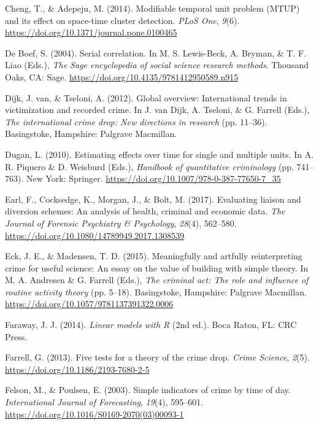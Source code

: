 \documentclass[
  english,
  man,a4paper,mask,floatsintext]{apa6}
\begin{document}
\leavevmode\hypertarget{ref-Cheng:2014aa}{}%
Cheng, T., \& Adepeju, M. (2014). Modifiable temporal unit problem (MTUP) and its effect on space-time cluster detection. \emph{PLoS One}, \emph{9}(6). \url{https://doi.org/10.1371/journal.pone.0100465}

\leavevmode\hypertarget{ref-De-Boef:2004aa}{}%
De Boef, S. (2004). Serial correlation. In M. S. Lewis-Beck, A. Bryman, \& T. F. Liao (Eds.), \emph{The Sage encyclopedia of social science research methods}. Thousand Oaks, CA: Sage. \url{https://doi.org/10.4135/9781412950589.n915}

\leavevmode\hypertarget{ref-Dijk:2012aa}{}%
Dijk, J. van, \& Tseloni, A. (2012). Global overview: International trends in victimization and recorded crime. In J. van Dijk, A. Tseloni, \& G. Farrell (Eds.), \emph{The international crime drop: New directions in research} (pp. 11--36). Basingstoke, Hampshire: Palgrave Macmillan.

\leavevmode\hypertarget{ref-Dugan:2010aa}{}%
Dugan, L. (2010). Estimating effects over time for single and multiple units. In A. R. Piquero \& D. Weisburd (Eds.), \emph{Handbook of quantitative criminology} (pp. 741--763). New York: Springer. \url{https://doi.org/10.1007/978-0-387-77650-7_35}

\leavevmode\hypertarget{ref-Earl:2017aa}{}%
Earl, F., Cocksedge, K., Morgan, J., \& Bolt, M. (2017). Evaluating liaison and diversion schemes: An analysis of health, criminal and economic data. \emph{The Journal of Forensic Psychiatry \& Psychology}, \emph{28}(4), 562--580. \url{https://doi.org/10.1080/14789949.2017.1308539}

\leavevmode\hypertarget{ref-Eck:2015aa}{}%
Eck, J. E., \& Madensen, T. D. (2015). Meaningfully and artfully reinterpreting crime for useful science: An essay on the value of building with simple theory. In M. A. Andresen \& G. Farrell (Eds.), \emph{The criminal act: The role and influence of routine activity theory} (pp. 5--18). Basingstoke, Hampshire: Palgrave Macmillan. \url{https://doi.org/10.1057/9781137391322.0006}

\leavevmode\hypertarget{ref-Faraway:2014aa}{}%
Faraway, J. J. (2014). \emph{Linear models with R} (2nd ed.). Boca Raton, FL: CRC Press.

\leavevmode\hypertarget{ref-Farrell:2013aa}{}%
Farrell, G. (2013). Five tests for a theory of the crime drop. \emph{Crime Science}, \emph{2}(5). \url{https://doi.org/10.1186/2193-7680-2-5}

\leavevmode\hypertarget{ref-Felson:2003fu}{}%
Felson, M., \& Poulsen, E. (2003). Simple indicators of crime by time of day. \emph{International Journal of Forecasting}, \emph{19}(4), 595--601. \url{https://doi.org/10.1016/S0169-2070(03)00093-1}
\end{document}
